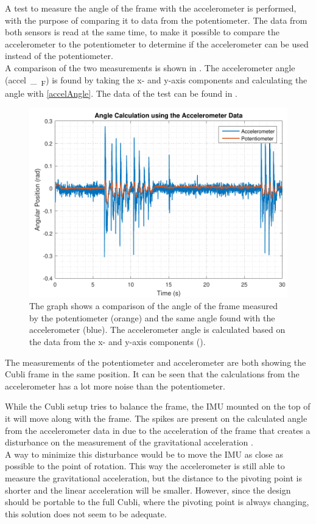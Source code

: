 A test to measure the angle of the frame with the accelerometer is performed, with the purpose of comparing it to data from the potentiometer. The data from both sensors is read at the same time, to make it possible to compare the accelerometer to the potentiometer to determine if the accelerometer can be used instead of the potentiometer.\\
A comparison of the two measurements is shown in . The accelerometer angle (\si{accel\_\theta_{F}}) is found by taking the x- and y-axis components and calculating the angle with \eqref{accelAngle}.
The data of the test can be found in  . 
%
\begin{figure}[H]
	\centering
	\includegraphics[scale=0.65]{figures/angleAcc}
	\caption{The graph shows a comparison of the angle of the frame measured by the potentiometer (orange) and the same angle found with the accelerometer (blue). The accelerometer angle is calculated based on the data from the x- and y-axis components ().}
	\label{angleAcc}
\end{figure}\vspace{-5mm}
%
The measurements of the potentiometer and accelerometer are both showing the Cubli frame in the same position. It can be seen that the calculations from the accelerometer has a lot more noise than the potentiometer.

While the Cubli setup tries to balance the frame, the IMU mounted on the top of it will move along with the frame. The spikes are present on the calculated angle from the accelerometer data in  due to the acceleration of the frame that creates a disturbance on the measurement of the gravitational acceleration \cite{JWarren}.\\
A way to minimize this disturbance would be to move the IMU as close as possible to the point of rotation. This way the accelerometer is still able to measure the gravitational acceleration, but the distance to the pivoting point is  shorter and the linear acceleration will be smaller. However, since the design should be portable to the full Cubli, where the pivoting point is always changing, this solution does not seem to be adequate.

